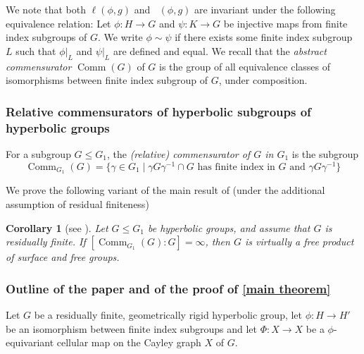 \documentclass{amsart}
\numberwithin{equation}{section}
\newtheorem{corollary}[theorem]{Corollary}
\theoremstyle{definition}
\newcommand{\ii}{^{-1}}
\DeclareMathOperator{\Comm}{Comm}
\DeclareMathOperator{\AL}{\ell_{Avg}}
\begin{document}
We note that both $\ell(\phi,g)$ and $\AL(\phi,g)$ are invariant under the following equivalence relation: Let $\phi:H\to G$ and $\psi:K\to G$ be injective maps from finite index subgroups of $G$. We write $\phi\sim \psi$ if there exists some finite index subgroup $L$ such that $\phi|_L$ and $\psi|_L$ are defined and equal.
We recall that the \emph{abstract commensurator} $\Comm(G)$ of $G$ is the group of all equivalence classes of isomorphisms between finite index subgroup of $G$, under composition.

\subsubsection*{Relative commensurators of hyperbolic subgroups of hyperbolic groups}

For a subgroup $G\le G_1$, the \emph{(relative) commensurator of $G$ in $G_1$} is the subgroup $$\Comm_{G_1}(G)=\{\gamma\in G_1\;|\;\gamma G \gamma\ii \cap G\text{ has finite index in }G\text{ and }\gamma G\gamma\ii\}$$

We prove the following variant of the main result of \cite{lazarovich2023commensurated} (under the additional assumption of residual finiteness) 
\begin{corollary}[see {\cite[Theorem A]{lazarovich2023commensurated}}]\label{cor commensurated hyperbolic subgroup} Let $G\le G_1$ be hyperbolic groups, and assume that $G$ is residually finite. If $[\Comm_{G_1}(G):G]=\infty$, then $G$ is virtually a free product of surface and free groups.
\end{corollary}





\subsubsection*{Outline of the paper and of the proof of \cref{main theorem}}

Let $G$ be a residually finite, geometrically rigid hyperbolic group, let $\phi:H\to H'$ be an isomorphism between finite index subgroups and let $\Phi:X\to X$ be a $\phi$-equivariant cellular map on the Cayley graph $X$ of $G$. 
\end{document}

